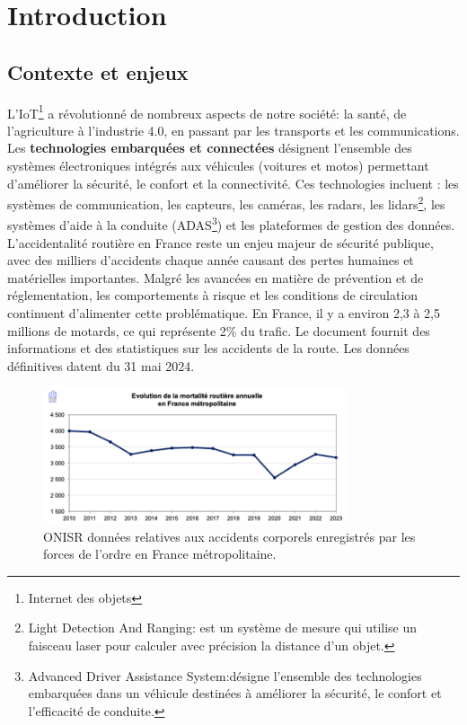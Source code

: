 \section{Introduction}
\subsection{Contexte et enjeux}
L'IoT\footnote{Internet des objets} a révolutionné de nombreux aspects de notre société: la santé, de l'agriculture à l'industrie 4.0, en passant par les transports et les communications.
Les \textbf{technologies embarquées et connectées} désignent l’ensemble des systèmes électroniques intégrés aux véhicules (voitures et motos) permettant d’améliorer la sécurité, le confort et la connectivité. Ces technologies incluent : les systèmes de communication, les capteurs, les caméras, les radars, les lidars\footnote{Light Detection And Ranging: est un système de mesure qui utilise un faisceau laser pour calculer avec précision la distance d’un objet.}, les systèmes d’aide à la conduite (ADAS\footnote{Advanced Driver Assistance System:désigne l’ensemble des technologies embarquées dans un véhicule destinées à améliorer la sécurité, le confort et l’efficacité de conduite. }) et les plateformes de gestion des données.\\
L’accidentalité routière en France reste un enjeu majeur de sécurité publique, avec des milliers d’accidents chaque année causant des pertes humaines et matérielles importantes. Malgré les avancées en matière de prévention et de réglementation, les comportements à risque et les conditions de circulation continuent d’alimenter cette problématique.
En France, il y a environ 2,3 à 2,5 millions de motards\cite{actiEouteNbMotardFr}, ce qui représente 2\%  du trafic.
Le document\cite{la_securite_routiere_accidentalite_2024} fournit des informations et des statistiques sur les accidents de la route. Les données définitives datent du 31 mai 2024.

\begin{figure}[h]
    \centering
    \includegraphics[width=0.8\textwidth]{images/evolution_mortalite_securite_routiere_france.png} 
    \caption{ONISR données relatives aux accidents corporels enregistrés par les forces de l'ordre en France métropolitaine.}
\end{figure}

